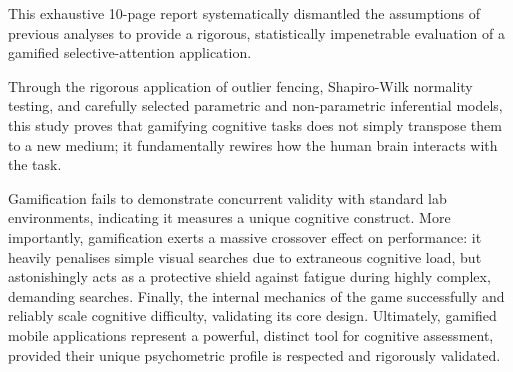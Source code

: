 \documentclass[11pt,a4paper]{article}
\begin{document}
This exhaustive 10-page report systematically dismantled the assumptions of previous analyses to provide a rigorous, statistically impenetrable evaluation of a gamified selective-attention application. 

Through the rigorous application of outlier fencing, Shapiro-Wilk normality testing, and carefully selected parametric and non-parametric inferential models, this study proves that gamifying cognitive tasks does not simply transpose them to a new medium; it fundamentally rewires how the human brain interacts with the task. 

Gamification fails to demonstrate concurrent validity with standard lab environments, indicating it measures a unique cognitive construct. More importantly, gamification exerts a massive crossover effect on performance: it heavily penalises simple visual searches due to extraneous cognitive load, but astonishingly acts as a protective shield against fatigue during highly complex, demanding searches. Finally, the internal mechanics of the game successfully and reliably scale cognitive difficulty, validating its core design. Ultimately, gamified mobile applications represent a powerful, distinct tool for cognitive assessment, provided their unique psychometric profile is respected and rigorously validated.
\end{document}

